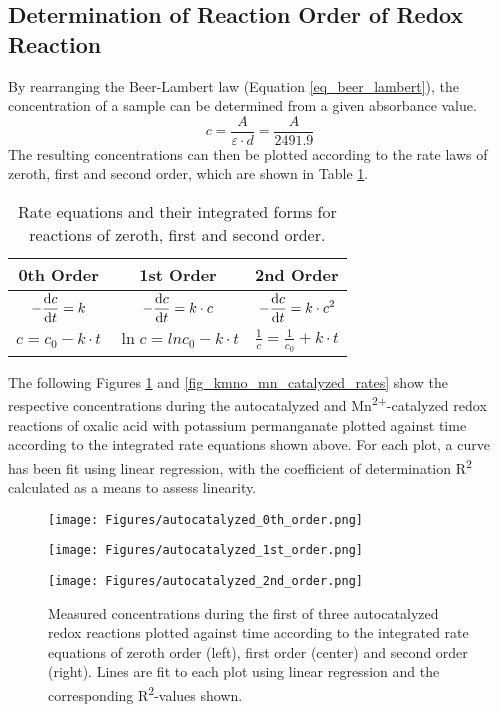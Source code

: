 \documentclass[titlepage]{article}
\begin{document}
\newpage
\subsection{Determination of Reaction Order of Redox Reaction}
By rearranging the Beer-Lambert law (Equation \ref{eq_beer_lambert}), the concentration of a sample can be determined from a given absorbance value.
%
\begin{equation} \label{eq_concentration_from_attenuation}
    c = \frac{A}{\varepsilon \cdot d} = \frac{A}{2491.9}
\end{equation}
%
The resulting concentrations can then be plotted according to the rate laws of zeroth, first and second order, which are shown in Table \ref{tb_rate_laws}.
%
\begin{table}[H]
    \centering
    \caption{Rate equations and their integrated forms for reactions of zeroth, first and second order.}
    \label{tb_rate_laws}
    \begin{tabular}{|c|c|c|}
        \hline
        \textbf{0th Order} & \textbf{1st Order} & \textbf{2nd Order}
        \\
        \hline
        \(\displaystyle -\odv{c}{t} = k\) & \(\displaystyle -\odv{c}{t} = k \cdot c\) & \(\displaystyle -\odv{c}{t} = k \cdot c^2\)
        \\
        \hline
        \(\displaystyle c = c_0 - k \cdot t\) & \(\displaystyle \ln{c} = ln{c_0} - k \cdot t\) & \(\displaystyle \frac{1}{c} = \frac{1}{c_0} + k \cdot t\)
        \\
        \hline
    \end{tabular}
\end{table}
%
\noindent The following Figures \ref{fig_kmno_autocatalyzed_rates} and \ref{fig_kmno_mn_catalyzed_rates} show the respective concentrations during the autocatalyzed and Mn\textsuperscript{2+}-catalyzed redox reactions of oxalic acid with potassium permanganate plotted against time according to the integrated rate equations shown above. For each plot, a curve has been fit using linear regression, with the coefficient of determination R\textsuperscript{2} calculated as a means to assess linearity.
%
\begin{figure}[H]
    \centering
    \begin{minipage}[c]{0.32\textwidth}
        \texttt{[image: Figures/autocatalyzed\_0th\_order.png]}
    \end{minipage}
    \begin{minipage}[c]{0.32\textwidth}
        \texttt{[image: Figures/autocatalyzed\_1st\_order.png]}
    \end{minipage}
    \begin{minipage}[c]{0.32\textwidth}
        \texttt{[image: Figures/autocatalyzed\_2nd\_order.png]}
    \end{minipage}
    \caption{Measured concentrations during the first of three autocatalyzed redox reactions plotted against time according to the integrated rate equations of zeroth order (left), first order (center) and second order (right). Lines are fit to each plot using linear regression and the corresponding R\textsuperscript{2}-values shown.}
    \label{fig_kmno_autocatalyzed_rates}
\end{figure}
\end{document}
